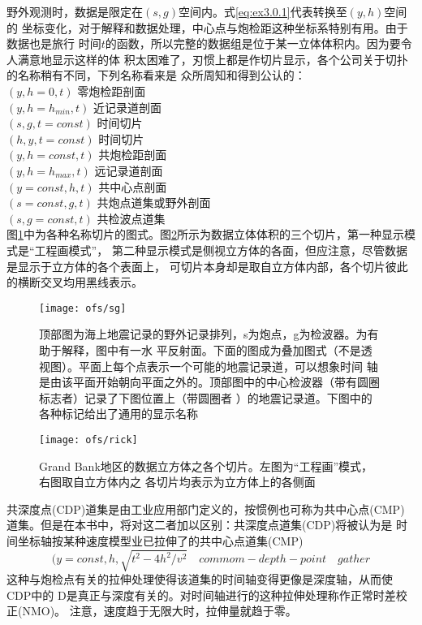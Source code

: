野外观测时，数据是限定在$(s,g)$空间内。式\ref{eq:ex3.0.1}代表转换至$(y,h)$空间的
坐标变化，对于解释和数据处理，中心点与炮检距这种坐标系特别有用。由于数据也是旅行
时间$t$的函数，所以完整的数据组是位于某一立体体积内。因为要令人满意地显示这样的体
积太困难了，刃惯上都是作切片显示，各个公司关于切扑的名称稍有不同，下列名称看来是
众所周知和得到公认的：\\
$(y,h=0,t)$  零炮检距剖面 \\
$(y,h=h_{min},t)$  近记录道剖面\\
$(s,g,t=const)$  时间切片\\
$(h,y,t=const)$  时间切片\\
$(y,h=const,t)$  共炮检距剖面\\
$(y,h=h_{max},t)$  远记录道剖面\\
$(y=const,h,t)$  共中心点剖面\\
$(s=const,g,t)$  共炮点道集或野外剖面\\
$(s,g=const,t)$  共检波点道集\\

图\ref{fig:ofs/sg}中为各种名称切片的图式。图\ref{fig:ofs/rick}所示为数据立体体积的三个切片，第一种显示模式是“工程画模式”，
第二种显示模式是侧视立方体的各面，但应注意，尽管数据是显示于立方体的各个表面上，
可切片本身却是取自立方体内部，各个切片彼此的横断交叉均用黑线表示。
\begin{figure}[H]
\centering
\texttt{[image: ofs/sg]}
\caption[sg]{顶部图为海上地震记录的野外记录排列，s为炮点，g为检波器。为有助于解释，图中有一水
平反射面。下面的图成为叠加图式（不是透视图）。平面上每个点表示一个可能的地震记录道，可以想象时间
轴是由该平面开始朝向平面之外的。顶部图中的中心检波器（带有圆圈标志者）记录了下图位置上（带圆圈者
）的地震记录道。下图中的各种标记给出了通用的显示名称}
\label{fig:ofs/sg}
\end{figure}

\begin{figure}[H]
\centering
\texttt{[image: ofs/rick]}
\caption[rick]{Grand Bank地区的数据立方体之各个切片。左图为“工程画”模式，右图取自立方体内之
各切片均表示为立方体上的各侧面}
\label{fig:ofs/rick}
\end{figure}
共深度点(CDP)道集是由工业应用部门定义的，按惯例也可称为共中心点(CMP)
道集。但是在本书中，将对这二者加以区别：共深度点道集(CDP)将被认为是
时间坐标轴按某种速度模型业已拉伸了的共中心点道集(CMP)
\begin{equation*}
(y=const,h,\sqrt{t^2-4h^2/v^2} \quad commom-depth-point\quad gather
\end{equation*}
这种与炮检点有关的拉伸处理使得该道集的时间轴变得更像是深度轴，从而使CDP中的
D是真正与深度有关的。对时间轴进行的这种拉伸处理称作正常时差校正(NMO)。
注意，速度趋于无限大时，拉伸量就趋于零。

